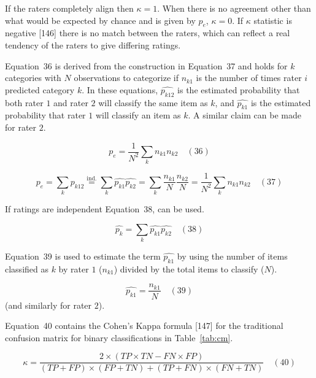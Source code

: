 \documentclass[preprint,12pt]{elsarticle}
\begin{document}
If the raters completely align then $\kappa = 1$. When there is no agreement other than what would be expected by chance and is given by $p_{e}$, $\kappa = 0$. If $\kappa$ statistic is negative [146] there is no match between the raters, which can reflect a real tendency of the raters to give differing ratings.

Equation~36 is derived from the construction in Equation~37 and holds for $k$ categories with $N$ observations to categorize if $n_{k1}$ is the number of times rater $i$ predicted category $k$. In these equations, ${\widehat{p_{k12}}}$ is the estimated probability that both rater $1$ and rater $2$ will classify the same item as $k$, and ${\widehat {p_{k1}}}$ is the estimated probability that rater $1$ will classify an item as $k$. A similar claim can be made for rater $2$.

\begin{equation}
	p_{e}={\frac {1}{N^{2}}}\sum_{k}n_{k1}n_{k2}
	\quad\left(36\right)
\end{equation}

\begin{equation}
	p_{e}=\sum_{k}{\widehat {p_{k12}}}{\overset{\text{ind.}}{=}}\sum_{k}{\widehat {p_{k1}}}{\widehat {p_{k2}}}=\sum_{k}{\frac {n_{k1}}{N}}{\frac {n_{k2}}{N}}={\frac {1}{N^{2}}}\sum_{k}n_{k1}n_{k2}
	\quad\left(37\right)
\end{equation}

If ratings are independent Equation~38, can be used.

\begin{equation}
	\textstyle{\widehat{p_{k}}}=\sum_{k}{\widehat{p_{k1}}}{\widehat {p_{k2}}}
	\quad\left(38\right)
\end{equation}

Equation~39 is used to estimate the term $\widehat{p_{k1}}$ by using the number of items classified as $k$ by rater $1$ ($n_{k1}$) divided by the total items to classify ($N$).

\begin{equation}
	\widehat {p_{k1}}=\frac{n_{k1}}{N}
	\quad\left(39\right)
\end{equation}
 (and similarly for rater $2$).
 
Equation~40 contains the Cohen's Kappa formula [147] for the traditional confusion matrix for binary classifications in Table~\ref{tab:cm}.

\begin{equation}
	\kappa ={\frac{2\times (TP\times TN-FN\times FP)}{(TP+FP)\times (FP+TN)+(TP+FN)\times (FN+TN)}}
	\quad\left(40\right)
\end{equation}
\end{document}
